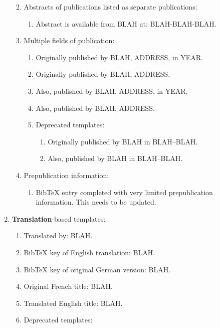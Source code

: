 \documentclass[letter,12pt]{article}
\begin{document}
\begin{enumerate}
\begin{enumerate}
\begin{enumerate}
		\end{enumerate}
	\item Abstracts of publications listed as separate publications: \vspace{-0.2cm}
		\begin{enumerate} \itemsep -2pt
		\item Abstract is available from BLAH at: BLAH-BLAH-BLAH.
		\end{enumerate}
	\item Multiple fields of publication: \vspace{-0.2cm}
		\begin{enumerate} \itemsep -2pt
		\item Originally published by BLAH, ADDRESS, in YEAR.
		\item Originally published by BLAH, ADDRESS.
		\item Also, published by BLAH, ADDRESS, in YEAR.
		\item Also, published by BLAH, ADDRESS.
		\item Deprecated templates: \vspace{-0.1cm}
			\begin{enumerate} \itemsep -1pt
			\item Originally published by BLAH in BLAH--BLAH.
			\item Also, published by BLAH in BLAH--BLAH.
			\end{enumerate}
		\end{enumerate}
	\item Prepublication information: \vspace{-0.2cm}
		\begin{enumerate} \itemsep -2pt
		\item BibTeX entry completed with very limited prepublication information. This needs to be updated.
		\end{enumerate}
	\end{enumerate}
\item {\bf Translation}-based templates: \vspace{-0.3cm}
	\begin{enumerate} \itemsep -2pt
	\item Translated by: BLAH.
	\item BibTeX key of English translation: BLAH.
	\item BibTeX key of original German version: BLAH.
	\item Original French title: BLAH.
	\item Translated English title: BLAH.
	\item Deprecated templates: \vspace{-0.2cm}

\end{enumerate}
\end{enumerate}
\end{document}
